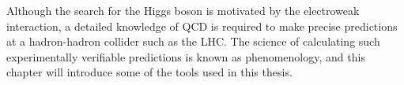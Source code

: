 
Although the search for the Higgs boson is motivated by the electroweak interaction, a
detailed knowledge of \ac{QCD} is required to make precise predictions at a hadron-hadron
collider such as the \acs{LHC}. The science of calculating such experimentally verifiable
predictions is known as phenomenology, and this chapter will introduce some of the tools
used in this thesis.
